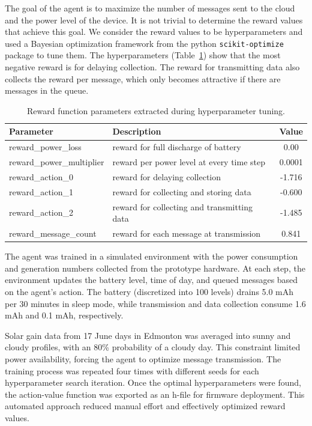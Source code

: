 \documentclass[10pt]{cai}
\begin{document}
The goal of the agent is to maximize the number of messages sent to the cloud and the power level of the device.
It is not trivial to determine the reward values that achieve this goal.
We consider the reward values to be hyperparameters and used a Bayesian optimization framework from the python \verb|scikit-optimize| package to tune them.
The hyperparameters (Table~\ref{tab:reward_parameters}) show that the most negative reward is for delaying collection. 
The reward for transmitting data also collects the reward per message, which only becomes attractive if there are messages in the queue.

\begin{table}[h]
  \centering
  \caption{Reward function parameters extracted during hyperparameter tuning.}
  \begin{tabular}{l p{8cm} c}
      \toprule
      \textbf{Parameter} & \textbf{Description} & \textbf{Value} \\
      \midrule
      reward\_power\_loss & reward for full discharge of battery & 0.00  \\ 
      reward\_power\_multiplier & reward per power level at every time step & 0.0001  \\ 
      reward\_action\_0 & reward for delaying collection & -1.716 \\ 
      reward\_action\_1 & reward for collecting and storing data & -0.600 \\ 
      reward\_action\_2 & reward for collecting and transmitting data & -1.485 \\ 
      reward\_message\_count & reward for each message at transmission & 0.841 \\ 
      \bottomrule
  \end{tabular}
  \label{tab:reward_parameters}
\end{table}

The agent was trained in a simulated environment with the power consumption and generation numbers collected from the prototype hardware.
At each step, the environment updates the battery level, time of day, and queued messages based on the agent's action.
The battery (discretized into 100 levels) drains 5.0 mAh per 30 minutes in sleep mode, while transmission and data collection consume 1.6 mAh and 0.1 mAh, respectively.

Solar gain data from 17 June days in Edmonton was averaged into sunny and cloudy profiles, with an 80\% probability of a cloudy day. 
This constraint limited power availability, forcing the agent to optimize message transmission. 
The training process was repeated four times with different seeds for each hyperparameter search iteration. 
Once the optimal hyperparameters were found, the action-value function was exported as an h-file for firmware deployment. 
This automated approach reduced manual effort and effectively optimized reward values.
\end{document}
